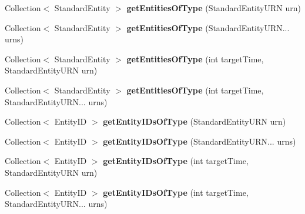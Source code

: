 \begin{DoxyCompactItemize}
Collection$<$ Standard\+Entity $>$ {\bfseries get\+Entities\+Of\+Type} (Standard\+Entity\+U\+RN urn)
\item 
\hypertarget{classadf_1_1agent_1_1info_1_1WorldInfo_a994cd387a916bdc6fa6c443d29e1395b}{}\label{classadf_1_1agent_1_1info_1_1WorldInfo_a994cd387a916bdc6fa6c443d29e1395b} 
Collection$<$ Standard\+Entity $>$ {\bfseries get\+Entities\+Of\+Type} (Standard\+Entity\+U\+R\+N... urns)
\item 
\hypertarget{classadf_1_1agent_1_1info_1_1WorldInfo_aae6a09ab680da00eea11da45cef45630}{}\label{classadf_1_1agent_1_1info_1_1WorldInfo_aae6a09ab680da00eea11da45cef45630} 
Collection$<$ Standard\+Entity $>$ {\bfseries get\+Entities\+Of\+Type} (int target\+Time, Standard\+Entity\+U\+RN urn)
\item 
\hypertarget{classadf_1_1agent_1_1info_1_1WorldInfo_ab92870c25f36a41d0c92bade56484a4e}{}\label{classadf_1_1agent_1_1info_1_1WorldInfo_ab92870c25f36a41d0c92bade56484a4e} 
Collection$<$ Standard\+Entity $>$ {\bfseries get\+Entities\+Of\+Type} (int target\+Time, Standard\+Entity\+U\+R\+N... urns)
\item 
\hypertarget{classadf_1_1agent_1_1info_1_1WorldInfo_a52b337e080b2cfb16a33df4e9c362d96}{}\label{classadf_1_1agent_1_1info_1_1WorldInfo_a52b337e080b2cfb16a33df4e9c362d96} 
Collection$<$ Entity\+ID $>$ {\bfseries get\+Entity\+I\+Ds\+Of\+Type} (Standard\+Entity\+U\+RN urn)
\item 
\hypertarget{classadf_1_1agent_1_1info_1_1WorldInfo_a9a6574eb107c3fdf33aab7476a10cd4d}{}\label{classadf_1_1agent_1_1info_1_1WorldInfo_a9a6574eb107c3fdf33aab7476a10cd4d} 
Collection$<$ Entity\+ID $>$ {\bfseries get\+Entity\+I\+Ds\+Of\+Type} (Standard\+Entity\+U\+R\+N... urns)
\item 
\hypertarget{classadf_1_1agent_1_1info_1_1WorldInfo_afaac6780a322bd3624525c957ad26143}{}\label{classadf_1_1agent_1_1info_1_1WorldInfo_afaac6780a322bd3624525c957ad26143} 
Collection$<$ Entity\+ID $>$ {\bfseries get\+Entity\+I\+Ds\+Of\+Type} (int target\+Time, Standard\+Entity\+U\+RN urn)
\item 
\hypertarget{classadf_1_1agent_1_1info_1_1WorldInfo_a32563a8f1443994d2aade92da90aa94e}{}\label{classadf_1_1agent_1_1info_1_1WorldInfo_a32563a8f1443994d2aade92da90aa94e} 
Collection$<$ Entity\+ID $>$ {\bfseries get\+Entity\+I\+Ds\+Of\+Type} (int target\+Time, Standard\+Entity\+U\+R\+N... urns)
\item 
\hypertarget{classadf_1_1agent_1_1info_1_1WorldInfo_a26732ade85e275d26d75123f2ac25b32}{}\label{classadf_1_1agent_1_1info_1_1WorldInfo_a26732ade85e275d26d75123f2ac25b32} 

\end{DoxyCompactItemize}
